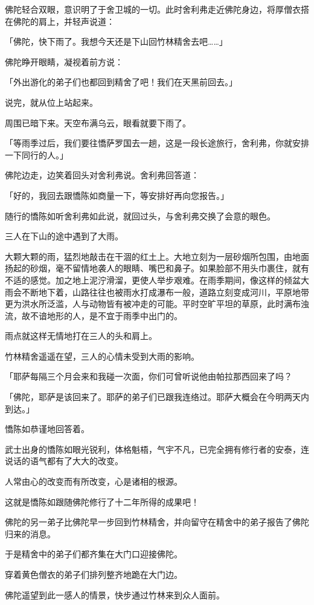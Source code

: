 \documentclass[twoside,openany]{book}
\begin{document}
佛陀轻合双眼，意识明了于舍卫城的一切。此时舍利弗走近佛陀身边，将厚僧衣搭在佛陀的肩上，并轻声说道：

「佛陀，快下雨了。我想今天还是下山回竹林精舍去吧……」

佛陀睁开眼睛，凝视着前方说：

「外出游化的弟子们也都回到精舍了吧！我们在天黑前回去。」

说完，就从位上站起来。

周围已暗下来。天空布满乌云，眼看就要下雨了。

「等雨季过后，我们要往憍萨罗国去一趟，这是一段长途旅行，舍利弗，你就安排一下同行的人。」

佛陀边走，边笑着回头对舍利弗说。舍利弗回答道：

「好的，我回去跟憍陈如商量一下，等安排好再向您报告。」

随行的憍陈如听舍利弗如此说，就回过头，与舍利弗交换了会意的眼色。

三人在下山的途中遇到了大雨。

大颗大颗的雨，猛烈地敲击在干涸的红土上。大地立刻为一层砂烟所包围，由地面扬起的砂烟，毫不留情地袭人的眼睛、嘴巴和鼻子。如果脸部不用头巾裹住，就有不适的感觉。加之地上泥泞滑溜，更使人举步艰难。在雨季期间，像这样的倾盆大雨会不断地下着，山路往往也被雨水打成瀑布一般，道路立刻变成河川，平原地带更为洪水所泛滥，人与动物皆有被冲走的可能。平时空旷平坦的草原，此时满布浊流，故不谙地形的人，是不宜于雨季中出门的。

雨点就这样无情地打在三人的头和肩上。

竹林精舍遥遥在望，三人的心情未受到大雨的影响。

「耶萨每隔三个月会来和我碰一次面，你们可曾听说他由帕拉那西回来了吗？

「佛陀，耶萨是该回来了。耶萨的弟子们已跟我连络过。耶萨大概会在今明两天内到达。」

憍陈如恭谨地回答着。

武士出身的憍陈如眼光锐利，体格魁梧，气宇不凡，已完全拥有修行者的安泰，连说话的语气都有了大大的改变。

人常由心的改变而有所改变，心是诸相的根源。

这就是憍陈如跟随佛陀修行了十二年所得的成果吧！

佛陀的另一弟子比佛陀早一步回到竹林精舍，并向留守在精舍中的弟子报告了佛陀归来的消息。

于是精舍中的弟子们都齐集在大门口迎接佛陀。

穿着黄色僧衣的弟子们排列整齐地跪在大门边。

佛陀遥望到此一感人的情景，快步通过竹林来到众人面前。
\end{document}
